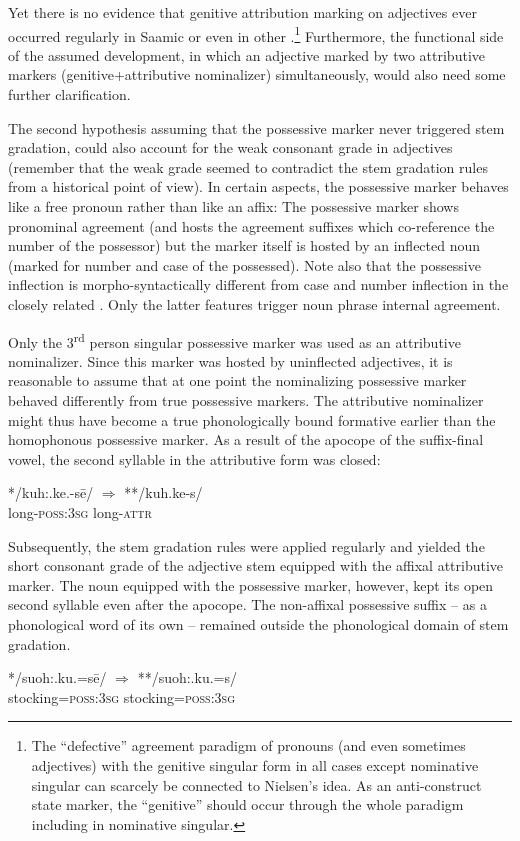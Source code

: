 {Yet there is no evidence that genitive attribution marking on adjectives ever occurred regularly in Saamic or even in other .\footnote{The “defective” agreement paradigm of pronouns (and even sometimes adjectives) with the genitive singular form in all cases except nominative singular can scarcely be connected to Nielsen's idea. As an anti-construct state marker, the “genitive” should occur through the whole paradigm including in nominative singular.} Furthermore, the functional side of the assumed development, in which an adjective marked by two attributive markers (genitive+attributive nominalizer) simultaneously, would also need some further clarification.

The second hypothesis assuming that the possessive marker never triggered stem gradation, could also account for the weak consonant grade in adjectives (remember that the weak grade seemed to contradict the stem gradation rules from a historical point of view). In certain aspects, the possessive marker behaves like a free pronoun rather than like an affix: The possessive marker shows pronominal agreement (and hosts the agreement suffixes which co-reference the number of the possessor) but the marker itself is hosted by an inflected noun (marked for number and case of the possessed). Note also that the possessive inflection is morpho-syntactically different from case and number inflection in the closely related . Only the latter features trigger noun phrase internal agreement.

Only the 3\textsuperscript{rd} person singular possessive marker was used as an attributive nominalizer. Since this marker was hosted by uninflected adjectives, it is reasonable to assume that at one point the nominalizing possessive marker behaved differently from true possessive markers. The attributive nominalizer might thus have become a true phonologically bound formative earlier than the homophonous possessive marker. As a result of the apocope of the suffix-final vowel, the second syllable in the attributive form was closed:
\begin{exe}
\ex 
\gll	**/kuh:.ke.-sē/ $\Rightarrow$ **/kuh.ke-s/\\
	long-\textsc{poss:3sg} {} long-\textsc{attr}\\
\end{exe}
Subsequently, the stem gradation rules were applied regularly and yielded the short consonant grade of the adjective stem equipped with the affixal attributive marker. The noun equipped with the possessive marker, however, kept its open second syllable even after the apocope. The non-affixal possessive suffix – as a phonological word of its own – remained outside the phonological domain of stem gradation.
\begin{exe}
\ex 
\gll	**/suoh:.ku.=sē/ $\Rightarrow$ **/suoh:.ku.=s/\\
	stocking=\textsc{poss:3sg} {} stocking=\textsc{poss:3sg}\\
\end{exe}

}
